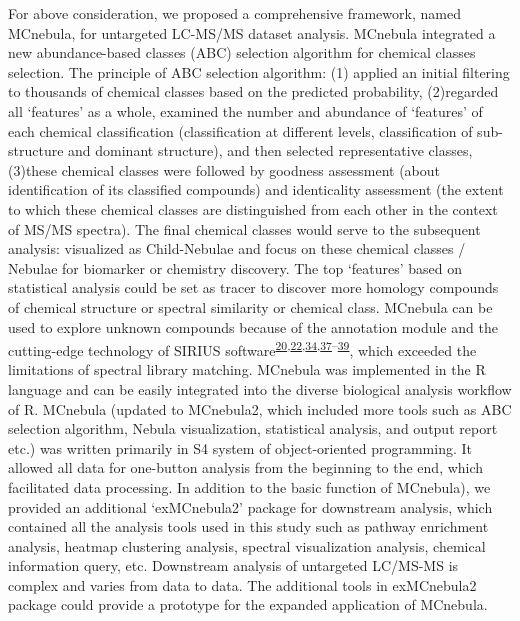 \documentclass[
]{article}
\begin{document}
For above consideration, we proposed a comprehensive framework, named
MCnebula, for untargeted LC-MS/MS dataset analysis. MCnebula integrated
a new abundance-based classes (ABC) selection algorithm for chemical
classes selection. The principle of ABC selection algorithm: (1) applied
an initial filtering to thousands of chemical classes based on the
predicted probability, (2)regarded all `features' as a whole, examined
the number and abundance of `features' of each chemical classification
(classification at different levels, classification of sub-structure and
dominant structure), and then selected representative classes, (3)these
chemical classes were followed by goodness assessment (about
identification of its classified compounds) and identicality assessment
(the extent to which these chemical classes are distinguished from each
other in the context of MS/MS spectra). The final chemical classes would
serve to the subsequent analysis: visualized as Child-Nebulae and focus
on these chemical classes / Nebulae for biomarker or chemistry
discovery. The top `features' based on statistical analysis could be set
as tracer to discover more homology compounds of chemical structure or
spectral similarity or chemical class. MCnebula can be used to explore
unknown compounds because of the annotation module and the cutting-edge
technology of SIRIUS
software\textsuperscript{\protect\hyperlink{ref-duhrkop_searching_2015}{20},\protect\hyperlink{ref-duhrkop_sirius_2019}{22},\protect\hyperlink{ref-duhrkop_systematic_2021}{34},\protect\hyperlink{ref-bocker_sirius_2009}{37}--\protect\hyperlink{ref-ludwig_database-independent_2020}{39}},
which exceeded the limitations of spectral library matching. MCnebula
was implemented in the R language and can be easily integrated into the
diverse biological analysis workflow of R. MCnebula (updated to
MCnebula2, which included more tools such as ABC selection algorithm,
Nebula visualization, statistical analysis, and output report etc.) was
written primarily in S4 system of object-oriented programming. It
allowed all data for one-button analysis from the beginning to the end,
which facilitated data processing. In addition to the basic function of
MCnebula), we provided an additional `exMCnebula2' package for
downstream analysis, which contained all the analysis tools used in this
study such as pathway enrichment analysis, heatmap clustering analysis,
spectral visualization analysis, chemical information query, etc.
Downstream analysis of untargeted LC/MS-MS is complex and varies from
data to data. The additional tools in exMCnebula2 package could provide
a prototype for the expanded application of MCnebula.
\end{document}

